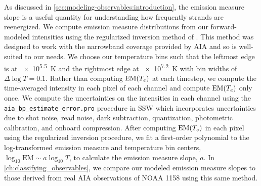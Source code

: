 As discussed in \autoref{sec:modeling-observables:introduction}, the emission measure slope is a useful quantity for understanding how frequently strands are reenergized. We compute emission measure distributions from our forward-modeled intensities using the regularized inversion method of \citet{hannah_differential_2012}. This method was designed to work with the narrowband coverage provided by AIA and so is well-suited to our needs. We choose our temperature bins such that the leftmost edge is at \SI{e5.5}{\kelvin} and the rightmost edge at \SI{e7.2}{\kelvin} with bin widths of $\Delta\log T=0.1$. Rather than computing $\textup{EM}(T_e)$ at each timestep, we compute the time-averaged intensity in each pixel of each channel and compute $\textup{EM}(T_e)$ only once. We compute the uncertainties on the intensities in each channel using the \texttt{aia\_bp\_estimate\_error.pro} procedure in SSW which incorporates uncertainties due to shot noise, read noise, dark subtraction, quantization, photometric calibration, and onboard compression. After computing $\textup{EM}(T_e)$ in each pixel using the regularized inversion procedure, we fit a first-order polynomial to the log-transformed emission measure and temperature bin centers, $\log_{10}\mathrm{EM}\sim a\log_{10}T$, to calculate the emission measure slope, $a$. In \autoref{ch:classifying_observables}, we compare our modeled emission measure slopes to those derived from real AIA observations of NOAA 1158 using this same method.

